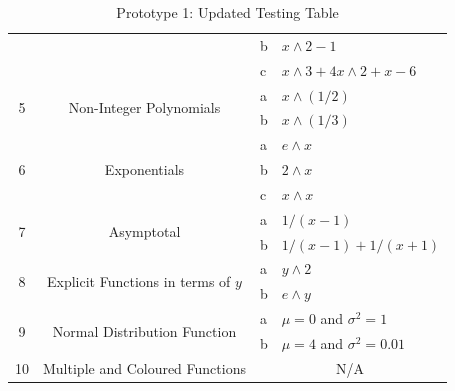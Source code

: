 \documentclass[../../../main.tex]{subfiles}
\begin{document}
\begin{table}[H]
\begin{tabular}{|c|c|l|l|}
                   &                                                            & b                                    & $x\wedge 2-1$                        \\ \cline{3-4} 
                   &                                                            & c                                    & $x\wedge 3+4x\wedge 2+x-6$                 \\ \hline
\multirow{2}{*}{5} & \multirow{2}{*}{Non-Integer Polynomials}                   & a                                    & $x\wedge (1/2)$                      \\ \cline{3-4} 
                   &                                                            & b                                    & $x\wedge (1/3)$                      \\ \hline
\multirow{3}{*}{6} & \multirow{3}{*}{Exponentials}                              & a                                    & $e\wedge x$                          \\ \cline{3-4} 
                   &                                                            & b                                    & $2\wedge x$                          \\ \cline{3-4} 
                   &                                                            & c                                    & $x\wedge x$                          \\ \hline
\multirow{2}{*}{7} & \multirow{2}{*}{Asymptotal}                                & a                                    & $1/(x-1)$                      \\ \cline{3-4} 
                   &                                                            & b                                    & $1/(x-1) + 1/(x+1)$            \\ \hline
\multirow{2}{*}{8} & \multirow{2}{*}{Explicit Functions in terms of $y$}        & a                                    & $y\wedge 2$                          \\ \cline{3-4} 
                   &                                                            & b                                    & $e\wedge y$                          \\ \hline
\multirow{2}{*}{9} & \multirow{2}{*}{Normal Distribution Function}              & a                                    & $\mu = 0$ and $\sigma^ 2 = 1$   \\ \cline{3-4} 
                   &                                                            & b                                    & $\mu = 4$ and $\sigma^ 2 = 0.01$ \\ \hline
10                 & Multiple and Coloured Functions                            & \multicolumn{2}{c|}{N/A}                                              \\ \hline
\end{tabular}
\caption{Prototype 1: Updated Testing Table}
\end{table}
\end{document}
